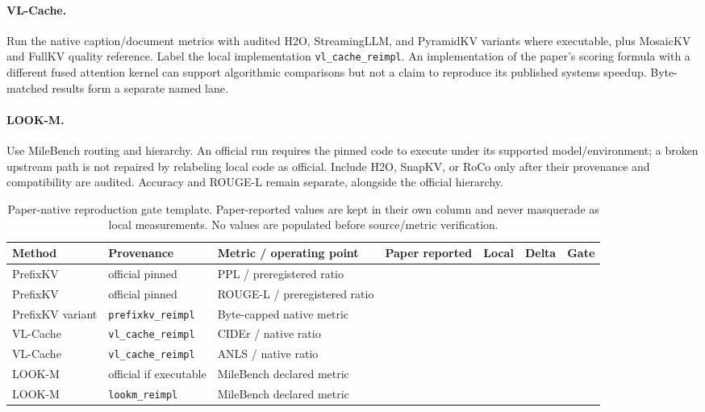 \paragraph{VL-Cache.}
Run the native caption/document metrics with audited H2O, StreamingLLM, and
PyramidKV variants where executable, plus MosaicKV and FullKV quality reference.
Label the local implementation \texttt{vl\_cache\_reimpl}. An implementation
of the paper's scoring formula with a different fused attention kernel can
support algorithmic comparisons but not a claim to reproduce its published
systems speedup. Byte-matched results form a separate named lane.

\paragraph{LOOK-M.}
Use MileBench routing and hierarchy. An official run requires the pinned code
to execute under its supported model/environment; a broken upstream path is
not repaired by relabeling local code as official. Include H2O, SnapKV, or RoCo
only after their provenance and compatibility are audited. Accuracy and ROUGE-L
remain separate, alongside the official hierarchy.

\begin{table}[t]
\caption{Paper-native reproduction gate template. Paper-reported values are
kept in their own column and never masquerade as local measurements. No values
are populated before source/metric verification.}
\small\begin{tabularx}{\textwidth}{lYYrrrr}\toprule
Method & Provenance & Metric / operating point & Paper reported & Local & Delta & Gate\\\midrule
PrefixKV & official pinned & PPL / preregistered ratio & & & & \\
PrefixKV & official pinned & ROUGE-L / preregistered ratio & & & & \\
PrefixKV variant & \texttt{prefixkv\_reimpl} & Byte-capped native metric & & & & \\
VL-Cache & \texttt{vl\_cache\_reimpl} & CIDEr / native ratio & & & & \\
VL-Cache & \texttt{vl\_cache\_reimpl} & ANLS / native ratio & & & & \\
LOOK-M & official if executable & MileBench declared metric & & & & \\
LOOK-M & \texttt{lookm\_reimpl} & MileBench declared metric & & & & \\
\bottomrule\end{tabularx}
\end{table}

